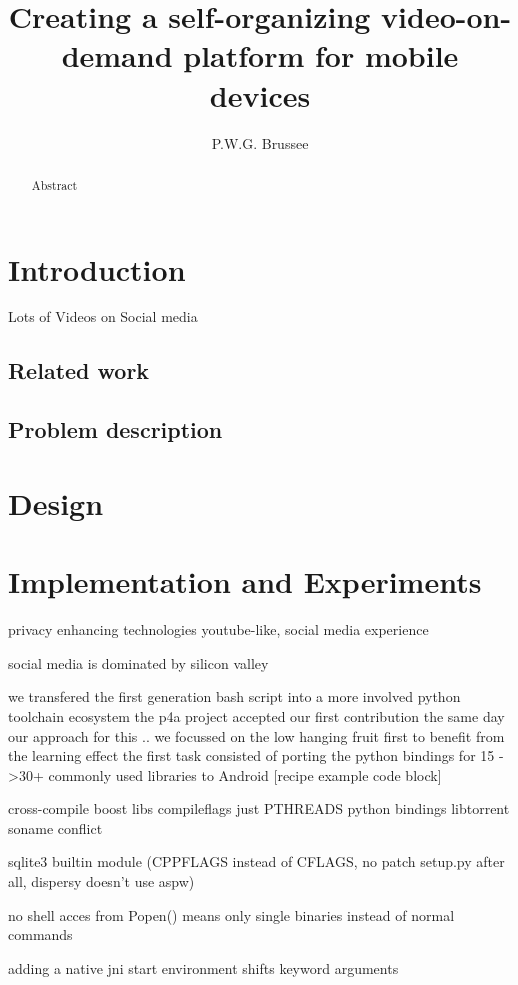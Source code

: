 \documentclass[]{report}
\title{Creating a self-organizing video-on-demand  platform for mobile devices}
\author{P.W.G. Brussee}
\begin{document}
\maketitle

\begin{abstract}
	Abstract
\end{abstract}


\chapter{Introduction}
Lots of Videos on Social media \cite{REF}


\section{Related work}

\section{Problem description}



\chapter{Design}




\chapter{Implementation and Experiments}




privacy enhancing technologies
youtube-like, social media experience

social media is dominated by silicon valley

we transfered the first generation bash script into a more involved python toolchain ecosystem
the p4a project accepted our first contribution the same day
our approach for this .. we focussed on the low hanging fruit first to benefit from the learning effect
the first task consisted of porting the python bindings for 15 ->30+ commonly used libraries to Android [recipe example code block]

cross-compile boost libs compileflags just PTHREADS
python bindings libtorrent soname conflict


sqlite3 builtin module (CPPFLAGS instead of CFLAGS, no patch setup.py after all, dispersy doesn't use aspw)


no shell acces from Popen() means only single binaries instead of normal commands

adding a native jni start environment shifts keyword arguments
\end{document}
